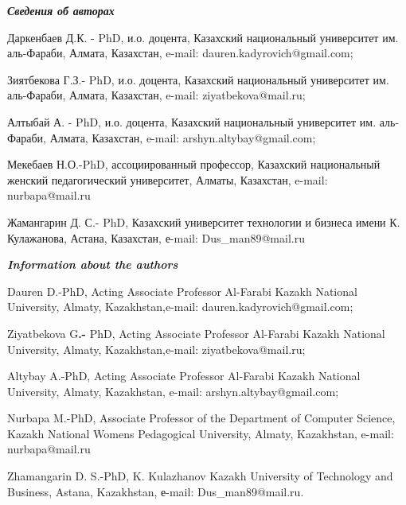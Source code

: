 \emph{{\bfseries Сведения об авторах}}

Даркенбаев Д.К. - PhD, и.о. доцента, Казахский национальный университет
им. аль-Фараби, Алмата, Казахстан, e-mail: dauren.kadyrovich@gmail.com;

Зиятбекова Г.З.- PhD, и.о. доцента, Казахский национальный университет
им. аль-Фараби, Алмата, Казахстан, e-mail: ziyatbekova@mail.ru;

Алтыбай А. - PhD, и.о. доцента, Казахский национальный университет им.
аль-Фараби, Алмата, Казахстан, e-mail: arshyn.altybay@gmail.com;

Мекебаев Н.О.-PhD, ассоциированный профессор, Казахский национальный
женский педагогический университет, Алматы, Казахстан, e-mail:
nurbapa@mail.ru

Жамангарин Д. С.- PhD, Казахский университет технологии и бизнеса имени
К. Кулажанова, Астана, Казахстан, е-mail: Dus\_man89@mail.ru

\emph{{\bfseries Information about the authors}}

Dauren D.-PhD, Acting Associate Professor Al-Farabi Kazakh National
University, Almaty, Kazakhstan,e-mail: dauren.kadyrovich@gmail.com;

Ziyatbekova G{\bfseries .-} PhD, Acting Associate Professor Al-Farabi
Kazakh National University, Almaty, Kazakhstan,e-mail:
ziyatbekova@mail.ru;

Altybay A.-PhD, Acting Associate Professor Al-Farabi Kazakh National
University, Almaty, Kazakhstan, e-mail: arshyn.altybay@gmail.com;

Nurbapa M.-PhD, Associate Professor of the Department of Computer
Science, Kazakh National Women\textquotesingle s Pedagogical University,
Almaty, Kazakhstan, e-mail: nurbapa@mail.ru

Zhamangarin D. S.-PhD, K. Kulazhanov Kazakh University of Technology and
Business, Astana, Kazakhstan, е-mail: Dus\_man89@mail.ru.